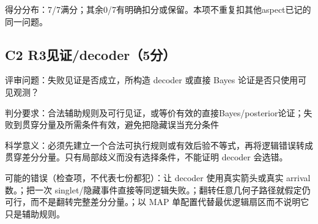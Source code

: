 \documentclass[11pt,a4paper]{article}
\begin{document}
得分分布：7/7满分；其余0/7有明确扣分或保留。本项不重复扣其他aspect已记的同一问题。

\clearpage
\subsection{C2 R3见证/decoder（5分）}
\label{aspect:C2}
评审问题：失败见证是否成立，所构造 decoder 或直接 Bayes 论证是否只使用可见观测？

判分要求：合法辅助规则及可行见证，或等价有效的直接Bayes/posterior论证；失败到贯穿分量及所需条件有效，避免把隐藏误当充分条件

科学意义：必须先建立一个合法可执行规则或有效后验不等式，再将逻辑错误转成贯穿差分分量。只有局部歧义而没有选择条件，不能证明 decoder 会选错。

可能的错误（检查项，不代表七份都犯）：让 decoder 使用真实箭头或真实 arrival 数。；把一次 singlet/隐藏事件直接等同逻辑失败。；翻转任意几何子路径就假定仍可行，而不是翻转完整差分分量。；以 MAP 单配置代替最优逻辑扇区而不说明它只是辅助规则。
\end{document}
